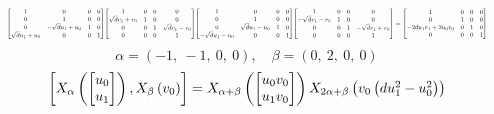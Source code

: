 \documentclass[11pt]{article}
\theoremstyle{definition}
\begin{document}
\[
\scaletoalign{\textwidth}{{\left[\begin{matrix}1 & 0 & 0 & 0\\0 & 1 & 0 & 0\\0 & - \sqrt{d} u_{1} + u_{0} & 1 & 0\\\sqrt{d} u_{1} + u_{0} & 0 & 0 & 1\end{matrix}\right]} {\left[\begin{matrix}1 & 0 & 0 & 0\\\sqrt{d} v_{1} + v_{0} & 1 & 0 & 0\\0 & 0 & 1 & \sqrt{d} v_{1} - v_{0}\\0 & 0 & 0 & 1\end{matrix}\right]} {\left[\begin{matrix}1 & 0 & 0 & 0\\0 & 1 & 0 & 0\\0 & \sqrt{d} u_{1} - u_{0} & 1 & 0\\- \sqrt{d} u_{1} - u_{0} & 0 & 0 & 1\end{matrix}\right]} {\left[\begin{matrix}1 & 0 & 0 & 0\\- \sqrt{d} v_{1} - v_{0} & 1 & 0 & 0\\0 & 0 & 1 & - \sqrt{d} v_{1} + v_{0}\\0 & 0 & 0 & 1\end{matrix}\right]} = {\left[\begin{matrix}1 & 0 & 0 & 0\\0 & 1 & 0 & 0\\- 2 d u_{1} v_{1} + 2 u_{0} v_{0} & 0 & 1 & 0\\0 & 0 & 0 & 1\end{matrix}\right]}}
\]
\[
\alpha = \left( -1, \  -1, \  0, \  0\right), \quad \beta = \left( 0, \  2, \  0, \  0\right)
\]
\[
\scaletoalign{\textwidth}{\left[ X_{\alpha}\left(\left[\begin{matrix}u_{0}\\u_{1}\end{matrix}\right]\right), X_{\beta}\left(v_{0}\right) \right] = X_{\alpha + \beta}\left(\left[\begin{matrix}u_{0} v_{0}\\u_{1} v_{0}\end{matrix}\right]\right) X_{2\alpha + \beta}\left(v_{0} \left(d u_{1}^{2} - u_{0}^{2}\right)\right)}
\]
\end{document}
